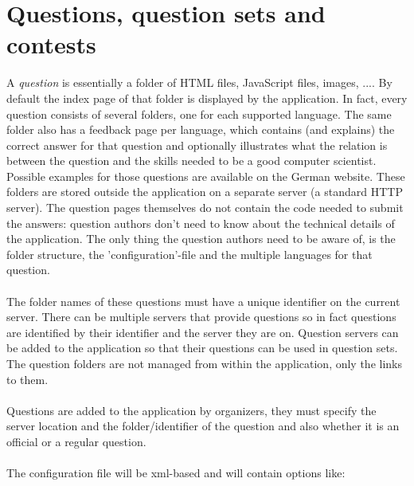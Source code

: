 \section{Questions, question sets and contests}

	A \emph{question} is essentially a folder of HTML files, JavaScript files, images, ....
	By default the index page of that folder is displayed by the application. In fact,
	every question consists of several folders, one for each supported language. The same
	folder also has a feedback page per language, which contains (and explains) the
	correct answer for that question and optionally illustrates what the relation is
	between the question and the skills needed to be a good computer scientist.
	Possible examples for those questions are available on the German website.
	These folders are stored outside the application on a separate server (a standard
	HTTP server). The question pages themselves do not contain the code needed to submit
	the answers: question authors don't need to know about the technical details of the
	application. The only thing the question authors need to be aware of, is the folder
	structure, the 'configuration'-file and the multiple languages for that question. \\
	\\
	The folder names of these questions must have a unique identifier on the current
	server. There can be multiple servers that provide questions so in fact questions
	are identified by their identifier and the server they are on. Question servers can be
	added to the application so that their questions can be used in question sets. The
	question folders are not managed from within the application, only the links to them.
	\\
	\\
	Questions are added to the application by organizers, they must specify the server
	location and the folder/identifier of the question and also whether it is an official
	or a regular question. 
	\\
	\\
	The configuration file will be xml-based and will contain options like:
